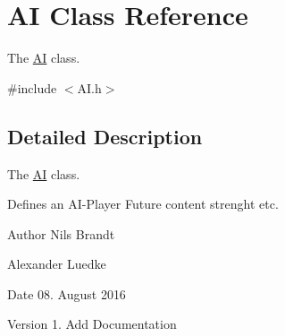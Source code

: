 \hypertarget{classAI}{\section{A\-I Class Reference}
\label{classAI}
}


The \hyperlink{classAI}{A\-I} class.  




{\ttfamily \#include $<$A\-I.\-h$>$}



\subsection{Detailed Description}
The \hyperlink{classAI}{A\-I} class. 

Defines an A\-I-\/\-Player Future content strenght etc.

\begin{DoxyAuthor}{Author}
Nils Brandt 

Alexander Luedke
\end{DoxyAuthor}
\begin{DoxyDate}{Date}
08. August 2016
\end{DoxyDate}
\begin{DoxyVersion}{Version}
1. Add Documentation 
\end{DoxyVersion}
